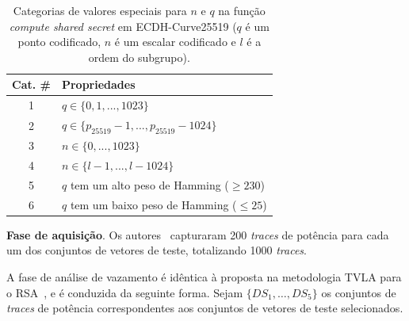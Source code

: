 \documentclass{SBCbookchapter}
\newcommand{\tblvertpaddingfactor}{1.3}
\newcommand{\tblhorizpadding}{3pt}
\begin{document}
\begin{table}[htb]\scriptsize
	\caption{Categorias de valores especiais para $n$ e $q$ na função \emph{compute shared secret} em ECDH-Curve25519 ($q$ é um ponto codificado, $n$ é um escalar codificado e $l$ é a ordem do subgrupo).}
	\label{tbSpecialValuesECDH}
	\begin{center}
		\bgroup
		\def\arraystretch{\tblvertpaddingfactor} %
		\setlength{\tabcolsep}{\tblhorizpadding} %
		\begin{tabular}{|c|l|}
			\hline
			Cat. \#	& Propriedades	\\ \hline \hline
			1		& $q \in \{0,1,...,1023\}$	\\ \hline 
			2		& $q \in \{p_{25519}-1,...,p_{25519}-1024\}$	\\ \hline 
			3		& $n \in \{0,...,1023\}$	\\ \hline
			4		& $n \in \{l-1,...,l-1024\}$	\\ \hline 
			5		& $q$ tem um alto peso de Hamming ($\geq 230$) \\ \hline
			6		& $q$ tem um baixo peso de Hamming ($\leq 25$) \\ \hline
		\end{tabular}
		\egroup
	\end{center} 
\end{table}

%
\noindent \textbf{Fase de aquisição}. Os autores~\cite{Nascimento2015_Space} capturaram 200 \emph{traces} de potência para cada um dos conjuntos de vetores de teste, totalizando 1000 \emph{traces}.
%

%
A fase de análise de vazamento é idêntica à proposta na metodologia TVLA para o RSA~\cite{Witteman2011}, e é conduzida da seguinte forma. Sejam $\{DS_1,\ldots,DS_5\}$ os conjuntos de \emph{traces} de potência correspondentes aos conjuntos de vetores de teste selecionados.
%

%
\end{document}
